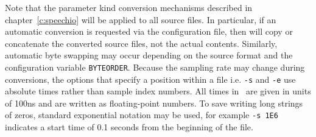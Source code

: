 Note that the parameter kind conversion 
mechanisms described in chapter~\ref{c:speechio}
will be applied to all source files.  In particular, if an automatic
conversion is requested via the configuration file, then  will copy
or concatenate the converted source files, not the actual contents.
Similarly, automatic byte swapping may occur depending on the source
format and the configuration variable \texttt{BYTEORDER}. Because the
sampling rate may change during conversions, the options that 
specify a position within a file i.e. \texttt{-s} and \texttt{-e}
use absolute times rather than sample index numbers.  All times in \HTK\
are given in units of 100ns and
are written as floating-point numbers. To save writing long strings of zeros, 
standard 
exponential notation may be used, for example \texttt{-s 1E6} indicates a
start time of 0.1 seconds from the beginning of the file.

